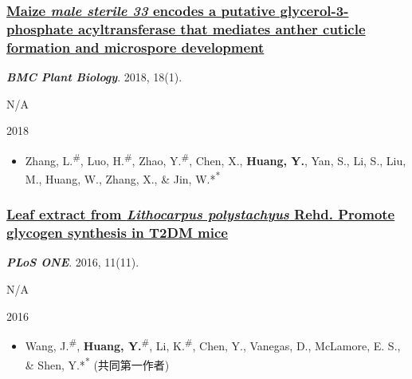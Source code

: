\documentclass[]{article}
\providecommand{\tightlist}{%
  \setlength{\itemsep}{0pt}\setlength{\parskip}{0pt}}
\begin{document}
\hypertarget{maize-male-sterile-33-encodes-a-putative-glycerol-3-phosphate-acyltransferase-that-mediates-anther-cuticle-formation-and-microspore-development}{%
\subsubsection{\texorpdfstring{\href{https://doi.org/10.1186/s12870-018-1543-7}{Maize
\emph{male sterile 33} encodes a putative glycerol-3-phosphate
acyltransferase that mediates anther cuticle formation and microspore
development}}{Maize male sterile 33 encodes a putative glycerol-3-phosphate acyltransferase that mediates anther cuticle formation and microspore development}}\label{maize-male-sterile-33-encodes-a-putative-glycerol-3-phosphate-acyltransferase-that-mediates-anther-cuticle-formation-and-microspore-development}}

\textbf{\emph{BMC Plant Biology}}. 2018, 18(1).

N/A

2018

\begin{itemize}
\tightlist
\item
  Zhang, L.\textsuperscript{\#}, Luo, H.\textsuperscript{\#}, Zhao,
  Y.\textsuperscript{\#}, Chen, X., \textbf{Huang, Y.}, Yan, S., Li, S.,
  Liu, M., Huang, W., Zhang, X., \& Jin, W.*\textsuperscript{*}
\end{itemize}

\hypertarget{leaf-extract-from-lithocarpus-polystachyus-rehd.-promote-glycogen-synthesis-in-t2dm-mice}{%
\subsubsection{\texorpdfstring{\href{https://dx.doi.org/10.1371/journal.pone.0166557}{Leaf
extract from \emph{Lithocarpus polystachyus} Rehd. Promote glycogen
synthesis in T2DM
mice}}{Leaf extract from Lithocarpus polystachyus Rehd. Promote glycogen synthesis in T2DM mice}}\label{leaf-extract-from-lithocarpus-polystachyus-rehd.-promote-glycogen-synthesis-in-t2dm-mice}}

\textbf{\emph{PLoS ONE}}. 2016, 11(11).

N/A

2016

\begin{itemize}
\tightlist
\item
  Wang, J.\textsuperscript{\#}, \textbf{Huang, Y.}\textsuperscript{\#},
  Li, K.\textsuperscript{\#}, Chen, Y., Vanegas, D., McLamore, E. S., \&
  Shen, Y.*\textsuperscript{*} (共同第一作者)
\end{itemize}
\end{document}
